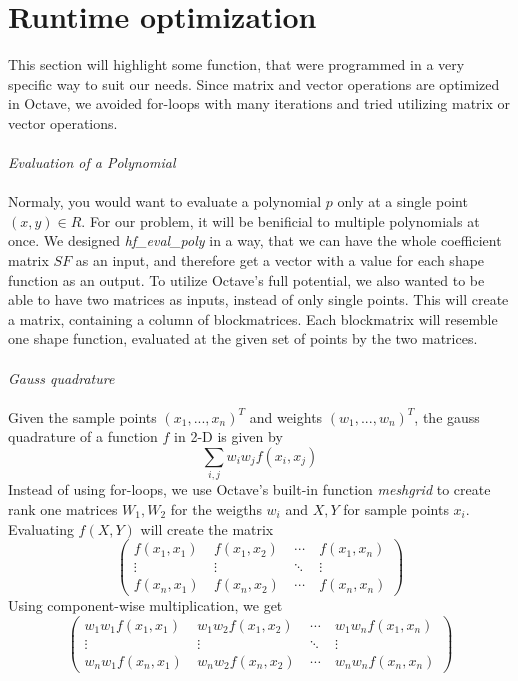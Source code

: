 \section{Runtime optimization}
This section will highlight some function, that were programmed in a very specific way to suit our needs. Since matrix and vector operations are optimized in Octave, we avoided for-loops with many iterations and tried utilizing matrix or vector operations.\\ \\
\textit{Evaluation of a Polynomial}\\ \\
Normaly, you would want to evaluate a polynomial $p$ only at a single point $(x,y)\in\!R$. For our problem, it will be benificial to multiple polynomials at once. We designed \textit{hf\_eval\_poly} in a way, that we can have the whole coefficient matrix $SF$ as an input, and therefore get a vector with a value for each shape function as an output. To utilize Octave's full potential, we also wanted to be able to have two matrices as inputs, instead of only single points. This will create a matrix, containing a column of blockmatrices. Each blockmatrix will resemble one shape function, evaluated at the given set of points by the two matrices.\\ \\
\newpage
\textit{Gauss quadrature}\\ \\
Given the sample points $(x_1,...,x_n)^T$ and weights $(w_1,...,w_n)^T$, the gauss quadrature of a function $f$ in 2-D is given by
\[\sum_{i,j} w_i w_j f(x_i,x_j)\]
Instead of using for-loops, we use Octave's built-in function \textit{meshgrid} to create rank one matrices $W_1,W_2$ for the weigths $w_i$ and $X,Y$ for sample points $x_i$. Evaluating $f(X,Y)$ will create the matrix 
\[\begin{pmatrix} f(x_1,x_1) &\ f(x_1,x_2) &\ \cdots &\ f(x_1,x_n) \\
\vdots &\ \vdots &\ \ddots &\ \vdots \\ 
f(x_n,x_1) &\ f(x_n,x_2) &\ \cdots &\ f(x_n,x_n) \end{pmatrix} \]
Using component-wise multiplication, we get 
\[\begin{pmatrix} w_1 w_ 1f(x_1,x_1) &\ w_1 w_2 f(x_1,x_2) &\ \cdots &\ w_1 w_n f(x_1,x_n) \\
\vdots &\ \vdots &\ \ddots &\ \vdots \\ 
w_n w_1 f(x_n,x_1) &\ w_n w_2 f(x_n,x_2) &\ \cdots &\ w_n w_n f(x_n,x_n) \end{pmatrix} \]
